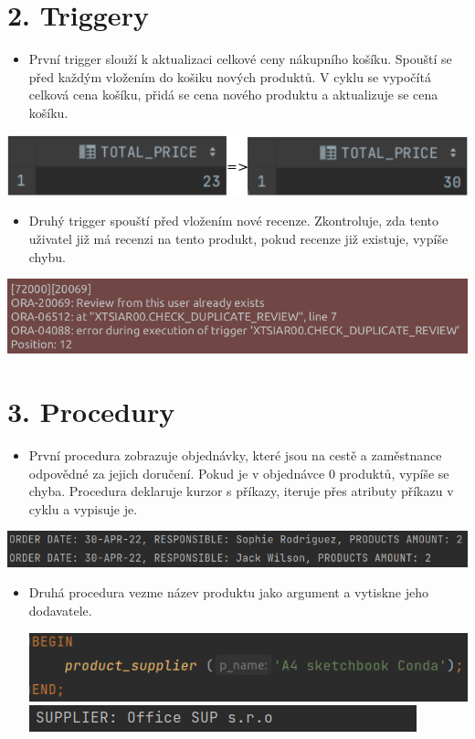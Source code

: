 \documentclass[12pt]{article}
\begin{document}
\section*{2. Triggery}
\begin{itemize}
    \item První trigger slouží k aktualizaci celkové ceny nákupního košíku. Spouští se před každým vložením do košiku nových produktů. V cyklu se vypočítá celková cena košíku, přidá se cena nového produktu a aktualizuje se cena košíku.
\end{itemize}
    \includegraphics[scale=0.54]{1-2.png}
\newpage
\begin{itemize}
    \item Druhý trigger spouští před vložením nové recenze. Zkontroluje, zda tento uživatel již má recenzi na tento produkt, pokud recenze již existuje, vypíše chybu.
\end{itemize}
\includegraphics[scale=0.6075]{3.png}


\section*{3. Procedury}
\begin{itemize}
    \item První procedura zobrazuje objednávky, které jsou na cestě a zaměstnance odpovědné za jejich doručení. Pokud je v objednávce 0 produktů, vypíše se chyba. Procedura deklaruje kurzor s příkazy, iteruje přes atributy příkazu v cyklu a vypisuje je.
\end{itemize}
    \includegraphics[scale=0.66]{4.png}
\begin{itemize}
    \item Druhá procedura vezme název produktu jako argument a vytiskne jeho dodavatele.
    \begin{center}
        \includegraphics[scale=0.66]{5.png}
        \includegraphics[scale=0.825]{6.png}
    \end{center}
\end{itemize}
\end{document}
